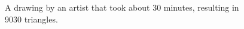\documentclass[review,draft]{acmsiggraph}
\begin{document}






\begin{figure}
    \centering
    \caption{A drawing by an artist that took about 30 minutes, resulting in 9030 triangles.} %
    \label{fig:face}
\end{figure}
\end{document}

